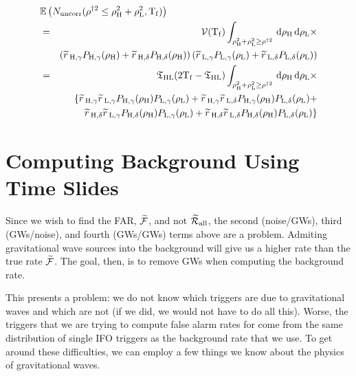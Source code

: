 \begin{eqnarray}
\label{eqn:exampleSources}
\lefteqn{ \mathbb{E}\left(N_{\mathrm{uncorr}}(\rho^{\dagger2} \leq \rho_\varH^2 + \rho_\varL^2, \Tf) \right) } \nonumber \\
 & = &  \vT(\mathrm{T_f}) \int_{\rho_\varH^2 + \rho_\varL^2 \geq \rho^{\dagger2}}  \d \rho_\varH \d \rho_\varL \times \nonumber \\
 & & \left(\rsrc_{\varH,\gamma}P_{\varH,\gamma}(\rho_\varH) + \rsrc_{\varH,\delta}P_{\varH,\delta}(\rho_\varH)\right) \left(\rsrc_{\varL,\gamma}P_{\varL,\gamma}(\rho_\varL) + \rsrc_{\varL,\delta}P_{\varL,\delta}(\rho_\varL)\right) \\ 
 & = & \coincT_{\varH\varL}(2\Tf - \coincT_{\varH\varL})\int_{\rho_\varH^2 + \rho_\varL^2 \geq \rho^{\dagger2}}  \d \rho_\varH \d \rho_\varL \times \nonumber \\
 & & \{ \rsrc_{\varH,\gamma}\rsrc_{\varL,\gamma}P_{\varH,\gamma}(\rho_\varH)P_{\varL,\gamma}(\rho_\varL) + \rsrc_{\varH,\gamma}\rsrc_{\varL,\delta}P_{\varH,\gamma}(\rho_\varH)P_{\varL,\delta}(\rho_\varL) + \nonumber \\
 & & \rsrc_{\varH,\delta}\rsrc_{\varL,\gamma}P_{\varH,\delta}(\rho_\varH)P_{\varL,\gamma}(\rho_\varL) + \rsrc_{\varH,\delta}\rsrc_{\varL,\delta}P_{\varH,\delta}(\rho_\varH)P_{\varL,\delta}(\rho_\varL) \}
\end{eqnarray}

\section{Computing Background Using Time Slides}

Since we wish to find the \ac{FAR}, $\widetilde{\mathcal{F}}$, and not $\widetilde{\mathcal{R}}_{\mathrm{all}}$, the second (noise/GWs), third (GWs/noise), and fourth (GWs/GWs) terms above are a problem. Admiting gravitational wave sources into the background will give us a higher rate than the true rate $\widetilde{\mathcal{F}}$. The goal, then, is to remove \acp{GW} when computing the background rate.

This presents a problem: we do not know which triggers are due to gravitational waves and which are not (if we did, we would not have to do all this). Worse, the triggers that we are trying to compute false alarm rates for come from the same distribution of single \ac{IFO} triggers as the background rate that we use. To get around these difficulties, we can employ a few things we know about the physics of gravitational waves.

